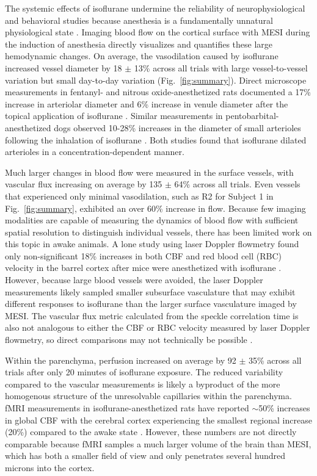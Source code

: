 \documentclass[12pt]{spieman}
\begin{document}
\begin{spacing}{2}
The systemic effects of isoflurane undermine the reliability of neurophysiological and behavioral studies because anesthesia is a fundamentally unnatural physiological state \cite{Gao:2017tw}. Imaging blood flow on the cortical surface with MESI during the induction of anesthesia directly visualizes and quantifies these large hemodynamic changes. On average, the vasodilation caused by isoflurane increased vessel diameter by 18 $\pm$ 13\% across all trials with large vessel-to-vessel variation but small day-to-day variation (Fig.~\ref{fig:summary}). Direct microscope measurements in fentanyl- and nitrous oxide-anesthetized rats documented a 17\% increase in arteriolar diameter and 6\% increase in venule diameter after the topical application of isoflurane \cite{Koenig:1994rn}. Similar measurements in pentobarbital-anesthetized dogs observed 10-28\% increases in the diameter of small arterioles following the inhalation of isoflurane \cite{Iida:1998th}. Both studies found that isoflurane dilated arterioles in a concentration-dependent manner.

Much larger changes in blood flow were measured in the surface vessels, with vascular flux increasing on average by 135 $\pm$ 64\% across all trials. Even vessels that experienced only minimal vasodilation, such as R2 for Subject 1 in Fig.~\ref{fig:summary}, exhibited an over 60\% increase in flow. Because few imaging modalities are capable of measuring the dynamics of blood flow with sufficient spatial resolution to distinguish individual vessels, there has been limited work on this topic in awake animals. A lone study using laser Doppler flowmetry found only non-significant 18\% increases in both CBF and red blood cell (RBC) velocity in the barrel cortex after mice were anesthetized with isoflurane \cite{Takuwa:2012ee}. However, because large blood vessels were avoided, the laser Doppler measurements likely sampled smaller subsurface vasculature that may exhibit different responses to isoflurane than the larger surface vasculature imaged by MESI. The vascular flux metric calculated from the speckle correlation time is also not analogous to either the CBF or RBC velocity measured by laser Doppler flowmetry, so direct comparisons may not technically be possible \cite{Kazmi:2015du}.

Within the parenchyma, perfusion increased on average by 92 $\pm$ 35\% across all trials after only 20 minutes of isoflurane exposure. The reduced variability compared to the vascular measurements is likely a byproduct of the more homogenous structure of the unresolvable capillaries within the parenchyma. fMRI measurements in isoflurane-anesthetized rats have reported $\sim$50\% increases in global CBF with the cerebral cortex experiencing the smallest regional increase (20\%) compared to the awake state \cite{Sicard:2003dj}. However, these numbers are not directly comparable because fMRI samples a much larger volume of the brain than MESI, which has both a smaller field of view and only penetrates several hundred microns into the cortex.


\end{spacing}
\end{document}
